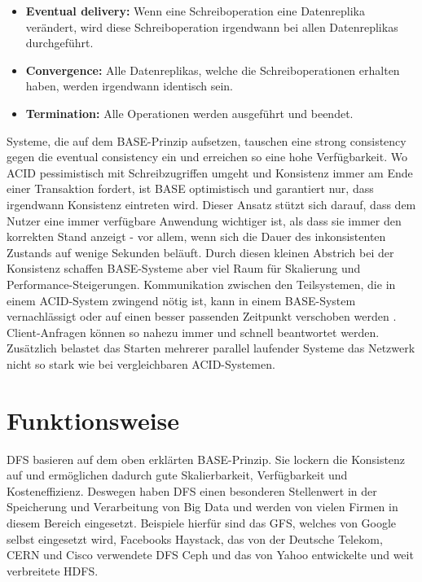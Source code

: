 \documentclass[12pt,oneside,a4paper,parskip]{scrbook}
\begin{document}
\begin{itemize}
  \item \textbf{Eventual delivery:} Wenn eine Schreiboperation eine Datenreplika verändert, wird diese Schreiboperation irgendwann bei allen Datenreplikas durchgeführt.
  \item \textbf{Convergence:} Alle Datenreplikas, welche die Schreiboperationen erhalten haben, werden irgendwann identisch sein.
  \item \textbf{Termination:} Alle Operationen werden ausgeführt und beendet.
\end{itemize}
Systeme, die auf dem BASE-Prinzip aufsetzen, tauschen eine strong consistency gegen die eventual consistency ein und erreichen so eine hohe Verfügbarkeit. Wo ACID pessimistisch mit Schreibzugriffen umgeht und Konsistenz immer am Ende einer Transaktion fordert, ist BASE optimistisch und garantiert nur, dass irgendwann Konsistenz eintreten wird. Dieser Ansatz stützt sich darauf, dass dem Nutzer eine immer verfügbare Anwendung wichtiger ist, als dass sie immer den korrekten Stand anzeigt - vor allem, wenn sich die Dauer des inkonsistenten Zustands auf wenige Sekunden beläuft. Durch diesen kleinen Abstrich bei der Konsistenz schaffen BASE-Systeme aber viel Raum für Skalierung und Performance-Steigerungen. Kommunikation zwischen den Teilsystemen, die in einem ACID-System zwingend nötig ist, kann in einem BASE-System vernachlässigt oder auf einen besser passenden Zeitpunkt verschoben werden \cite{clusterBASE}. Client-Anfragen können so nahezu immer und schnell beantwortet werden. Zusätzlich belastet das Starten mehrerer parallel laufender Systeme das Netzwerk nicht so stark wie bei vergleichbaren ACID-Systemen.

\section{Funktionsweise}
DFS basieren auf dem oben erklärten BASE-Prinzip. Sie lockern die Konsistenz auf und ermöglichen dadurch gute Skalierbarkeit, Verfügbarkeit und Kosteneffizienz. Deswegen haben DFS einen besonderen Stellenwert in der Speicherung und Verarbeitung von Big Data und werden von vielen Firmen in diesem Bereich eingesetzt. Beispiele hierfür sind das GFS, welches von Google selbst eingesetzt wird, Facebooks Haystack, das von der Deutsche Telekom, CERN und Cisco verwendete DFS Ceph \cite{ceph} und das von Yahoo entwickelte und weit verbreitete HDFS.
\end{document}
